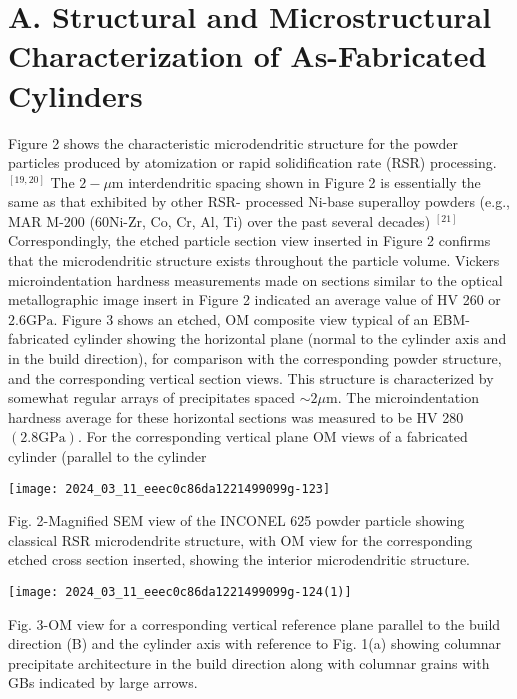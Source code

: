 \documentclass[10pt]{article}
\begin{document}
\section*{A. Structural and Microstructural Characterization of As-Fabricated Cylinders}
Figure 2 shows the characteristic microdendritic structure for the powder particles produced by atomization or rapid solidification rate (RSR) processing. ${ }^{[19,20]}$ The $2-\mu \mathrm{m}$ interdendritic spacing shown in Figure 2 is essentially the same as that exhibited by other RSR- processed Ni-base superalloy powders (e.g., MAR M-200 (60Ni-Zr, Co, Cr, Al, Ti) over the past several decades) ${ }^{[21]}$ Correspondingly, the etched particle section view inserted in Figure 2 confirms that the microdendritic structure exists throughout the particle volume. Vickers microindentation hardness measurements made on sections similar to the optical metallographic image insert in Figure 2 indicated an average value of HV 260 or $2.6 \mathrm{GPa}$. Figure 3 shows an etched, OM composite view typical of an EBM-fabricated cylinder showing the horizontal plane (normal to the cylinder axis and in the build direction), for comparison with the corresponding powder structure, and the corresponding vertical section views. This structure is characterized by somewhat regular arrays of precipitates spaced $\sim 2 \mu \mathrm{m}$. The microindentation hardness average for these horizontal sections was measured to be HV 280 $(2.8 \mathrm{GPa})$. For the corresponding vertical plane $\mathrm{OM}$ views of a fabricated cylinder (parallel to the cylinder

\begin{center}
\texttt{[image: 2024\_03\_11\_eeec0c86da1221499099g-123]}
\end{center}

Fig. 2-Magnified SEM view of the INCONEL 625 powder particle showing classical RSR microdendrite structure, with OM view for the corresponding etched cross section inserted, showing the interior microdendritic structure.

\begin{center}
\texttt{[image: 2024\_03\_11\_eeec0c86da1221499099g-124(1)]}
\end{center}

Fig. 3-OM view for a corresponding vertical reference plane parallel to the build direction (B) and the cylinder axis with reference to Fig. 1(a) showing columnar precipitate architecture in the build direction along with columnar grains with GBs indicated by large arrows.
\end{document}
